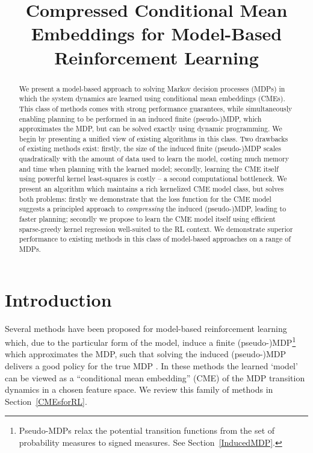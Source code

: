 \documentclass[letterpaper]{article}
\newcommand{\CsabaFLAM}{DBLP:conf/adprl/YaoSPZ14}
\newcommand{\GrunewalderEmbeddingsRL}{GrunewalderEmbeddingsMDP}
\newcommand{\OrmoneitKBRL}{DBLP:journals/ml/OrmoneitS02}
\begin{document}
%
\title{Compressed Conditional Mean Embeddings for Model-Based Reinforcement Learning}
\maketitle

\begin{abstract} We present a model-based approach to solving Markov decision processes (MDPs) in which the system dynamics are learned using conditional mean embeddings (CMEs). This class of methods comes with strong performance guarantees, while simultaneously enabling planning to be performed in an induced finite (pseudo-)MDP, which approximates the MDP, but can be solved exactly using dynamic programming.
%
We begin by presenting a unified view of existing algorithms in this class. Two drawbacks of existing methods exist: firstly, the size of the induced finite (pseudo-)MDP scales quadratically with the amount of data used to learn the model, costing much memory and time when planning with the learned model; secondly, learning the CME itself using powerful kernel least-squares is costly -- a second computational bottleneck. We present an algorithm which maintains a rich kernelized CME model class, but solves both problems: firstly we demonstrate that the loss function for the CME model suggests a principled approach to \emph{compressing} the induced (pseudo-)MDP, leading to faster planning; secondly we propose to learn the CME model itself using efficient sparse-greedy kernel regression well-suited to the RL context. We demonstrate superior performance to existing methods in this class of model-based approaches on a range of MDPs.
\end{abstract}

\section{Introduction}

Several methods have been proposed for model-based reinforcement learning which, due to the particular form of the model, induce a finite (pseudo-)MDP\footnote{Pseudo-MDPs relax the potential transition functions from the set of probability measures to signed measures. See Section~\ref{InducedMDP}.} which approximates the MDP, such that solving the induced (pseudo-)MDP delivers a good policy for the true MDP \citep{\OrmoneitKBRL,\GrunewalderEmbeddingsRL,\CsabaFLAM}. In these methods the learned `model' can be viewed as a ``conditional mean embedding'' (CME) of the MDP transition dynamics in a chosen feature space. We review this family of methods in Section~\ref{CMEsforRL}.
\end{document}
